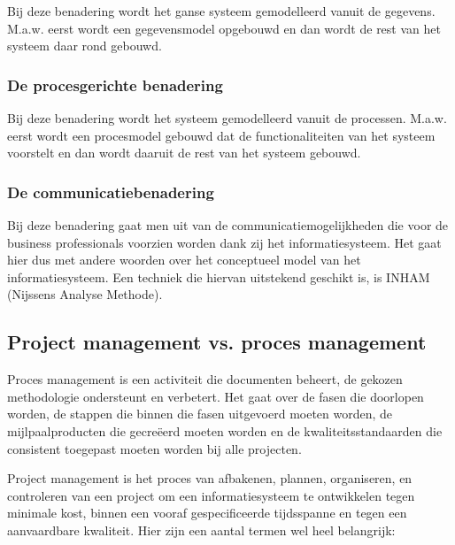 Bij deze benadering wordt het ganse systeem gemodelleerd vanuit de gegevens. M.a.w. eerst wordt een gegevensmodel opgebouwd en dan wordt de rest van het systeem daar rond gebouwd.

\subsubsection{De procesgerichte benadering}

Bij deze benadering wordt het systeem gemodelleerd vanuit de processen. M.a.w. eerst wordt een procesmodel gebouwd dat de functionaliteiten van het systeem voorstelt en dan wordt daaruit de rest van het systeem gebouwd.

\subsubsection{De communicatiebenadering}

Bij deze benadering gaat men uit van de communicatiemogelijkheden die voor de business professionals voorzien worden dank zij het informatiesysteem. Het gaat hier dus met andere woorden over het conceptueel model van het informatiesysteem. Een techniek die hiervan uitstekend geschikt is, is INHAM (Nijssens Analyse Methode).

\subsection{Project management vs. proces management}

Proces management is een activiteit die documenten beheert, de gekozen methodologie ondersteunt en verbetert. Het gaat over de fasen die doorlopen worden, de stappen die binnen die fasen uitgevoerd moeten worden, de mijlpaalproducten die gecreëerd moeten worden en de kwaliteitsstandaarden die consistent toegepast moeten worden bij alle projecten.

Project management is het proces van afbakenen, plannen, organiseren, en controleren van een project om een informatiesysteem te ontwikkelen tegen minimale kost, binnen een vooraf gespecificeerde tijdsspanne en tegen een aanvaardbare kwaliteit.
Hier zijn een aantal termen wel heel belangrijk:

